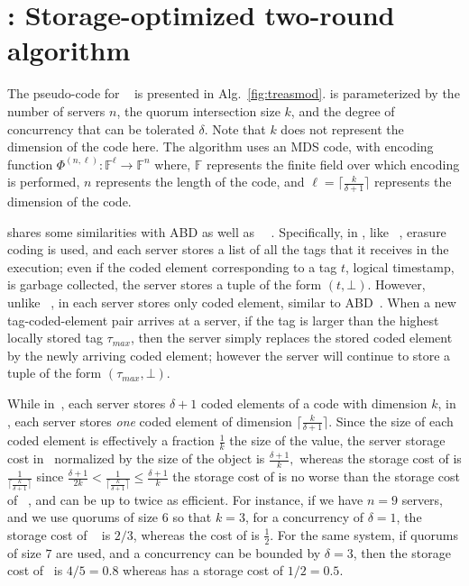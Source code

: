 \section{\treasmod: Storage-optimized two-round algorithm}\label{sec:treasmod}
The pseudo-code for  ~\treasmod{} is presented in  Alg.~\ref{fig:treasmod}. 
\treasmod{} is parameterized by the number of servers $n$, the quorum intersection size $k$, and the degree of concurrency that can be tolerated $\delta$. Note that $k$ does not represent the dimension of the code here. 
%
The algorithm uses an MDS code, with encoding function $\Phi^{(n,\ell)}: \mathbb{F}^{\ell} \rightarrow \mathbb{F}^{n}$ where, $\mathbb{F}$ represents the finite field over which encoding is performed, $n$ represents the length of the code, and $\ell = {\lceil \frac{k}{\delta+1} \rceil} $ represents the dimension of the code. 

\treasmod{}  shares some similarities with ABD \cite{ABD96} as well as ~\treas~\cite{NicolaouC0KML19}. Specifically, in \treasmod{}, like ~\treas{}, erasure coding is used, and each server stores a list of all the tags that it receives in the execution; even if the coded element corresponding to a tag $t$, logical timestamp, is garbage collected, the server stores a tuple of the form $(t, \bot)$. However, unlike ~\treas{}, in \treasmod{} each server stores only coded element, similar to ABD~\cite{ABD96}. When a new tag-coded-element pair arrives  at a server, if the tag is larger than the highest locally stored tag $\tau_{max}$, then the server simply replaces the stored coded element by the newly arriving coded element; however the server will continue to store a tuple of the form $(\tau_{max},\bot)$.

While in~\treas{}, each server stores $\delta+1$ coded elements of a code with dimension $k$, in \treasmod{}, each server stores \emph{one} coded element of dimension ${\lceil \frac{k}{\delta+1} \rceil}$. Since the size of each coded element is effectively a fraction $\frac{1}{k}$ the size of the value, the server storage cost in~\treas{} normalized by the size of the object is $\frac{\delta+1}{k},$ whereas the storage cost of \treasmod{} is $\frac{1}{\lceil \frac{k}{\delta+1}\rceil}$  since 
$  \frac{\delta+1}{2 k} < \frac{1}{\lceil \frac{k}{\delta+1}\rceil} \leq \frac{\delta+1}{k}$
the storage cost of \treasmod{} is no worse than the storage cost of ~\treas{}, and can be up to twice as efficient. For instance, if we have $n=9$ servers, and we use quorums of size $6$ so that $k=3$, for a concurrency of $\delta=1$, the storage cost of ~\treas{} is $2/3$, whereas the cost of \treasmod{} is $\frac{1}{2}.$ For the same system, if quorums of size $7$ are used, and a concurrency can be bounded by $\delta=3$, then the storage cost of~\treas{} is $4/5=0.8$ whereas \treasmod{} has a storage cost of $1/2=0.5$. 


